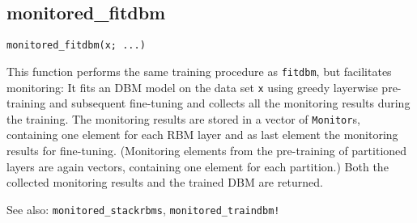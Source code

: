 \subsection*{monitored\_fitdbm}
\begin{verbatim}
monitored_fitdbm(x; ...)
\end{verbatim}
This function performs the same training procedure as \texttt{fitdbm}, but facilitates monitoring: It fits an DBM model on the data set \texttt{x} using greedy layerwise pre-training and subsequent fine-tuning and collects all the monitoring results during the training. The monitoring results are stored in a vector of \texttt{Monitor}s, containing one element for each RBM layer and as last element the monitoring results for fine-tuning. (Monitoring elements from the pre-training of partitioned layers are again vectors, containing one element for each partition.) Both the collected monitoring results and the trained DBM are returned.

See also: \texttt{monitored\_stackrbms}, \texttt{monitored\_traindbm!}

